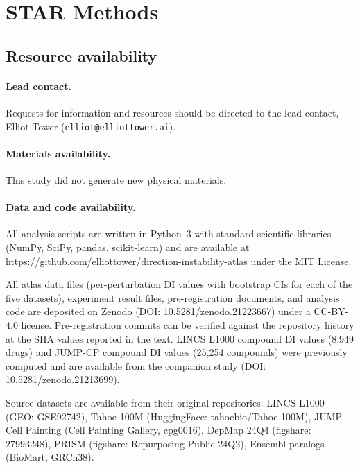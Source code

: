 \documentclass[11pt]{article}
\begin{document}

\section*{STAR Methods}

\subsection*{Resource availability}

\paragraph{Lead contact.}
Requests for information and resources should be directed to the lead
contact, Elliot Tower (\texttt{elliot@elliottower.ai}).

\paragraph{Materials availability.}
This study did not generate new physical materials.

\paragraph{Data and code availability.}
All analysis scripts are written in Python~3 with standard scientific
libraries (NumPy, SciPy, pandas, scikit-learn) and are available at
\url{https://github.com/elliottower/direction-instability-atlas} under
the MIT License.

All atlas data files (per-perturbation DI values with bootstrap CIs for
each of the five datasets), experiment result files, pre-registration
documents, and analysis code are deposited on Zenodo
(DOI: 10.5281/zenodo.21223667) under a CC-BY-4.0 license.
Pre-registration commits can be verified against the repository history
at the SHA values reported in the text.  LINCS L1000 compound DI values
(8{,}949 drugs) and JUMP-CP compound DI values (25{,}254 compounds)
were previously computed and are available from the companion study
(DOI: 10.5281/zenodo.21213699).

Source datasets are available from their original repositories: LINCS
L1000 (GEO: GSE92742), Tahoe-100M (HuggingFace: tahoebio/Tahoe-100M),
JUMP Cell Painting (Cell Painting Gallery, cpg0016), DepMap 24Q4
(figshare: 27993248), PRISM (figshare: Repurposing Public 24Q2),
Ensembl paralogs (BioMart, GRCh38).
\end{document}
